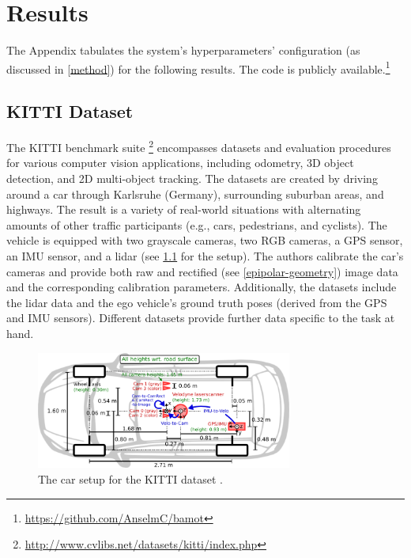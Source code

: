 \documentclass[headsepline, hidelinks, footsepline, footinclude=false, oneside, fontsize=11pt, paper=a4, listof=totoc, bibliography=totoc]{scrbook}
\begin{document}
\chapter{Results \label{results}}
\label{sec:orgab14fbb}
   The Appendix tabulates the system's hyperparameters' configuration (as discussed in \cref{method}) for the following results. 
The code is publicly available.\footnote{\url{https://github.com/AnselmC/bamot}}

\section{KITTI Dataset \label{kitti-dataset}}
\label{sec:org3c430b4}
   The KITTI benchmark suite \cite{geigerVisionMeetsRobotics2013}\footnote{\url{http://www.cvlibs.net/datasets/kitti/index.php}} encompasses datasets and evaluation procedures for various computer vision applications, 
including odometry, 3D object detection, and 2D multi-object tracking. The datasets are created by driving around a car through Karlsruhe (Germany), surrounding suburban areas, and highways. The result is a variety of real-world situations with alternating amounts of other traffic participants (e.g., cars, pedestrians, and cyclists). The vehicle is equipped with two grayscale cameras, two RGB cameras, a GPS sensor, an IMU sensor,
and a \gls{lidar} (see \cref{fig:kitti-car} for the setup). The authors calibrate the car's cameras and provide both raw and rectified (see \cref{epipolar-geometry}) image data and the corresponding calibration parameters.
Additionally, the datasets include the \gls{lidar} data and the ego vehicle's ground truth poses (derived from the GPS and IMU sensors). Different datasets provide further data specific to the task at hand.

\begin{figure}[htbp]
\centering
\includegraphics[width=0.75\textwidth]{figures/kitti-car.png}
\caption{\label{fig:kitti-car}The car setup for the KITTI dataset \cite{geigerVisionMeetsRobotics2013}.}
\end{figure}
\end{document}
